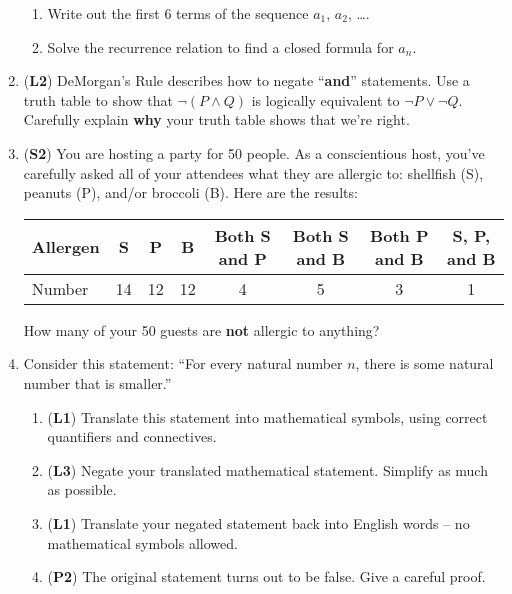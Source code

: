\documentclass[12pt]{article}
\begin{document}
\begin{enumerate}
\begin{enumerate}
    \item Write out the first 6 terms of the sequence $a_1$, $a_2$, \ldots.
    
    \item Solve the recurrence relation to find a closed formula for $a_n$.
    
\end{enumerate}


\item (\textbf{L2}) DeMorgan's Rule describes how to negate ``\textbf{and}'' statements. Use a truth table to show that  $\lnot(P \land Q)$ is logically equivalent to  $\lnot P \lor \lnot Q$.  Carefully explain \textbf{why} your truth table shows that we're right.


\item (\textbf{S2}) You are hosting a party for 50 people. As a conscientious host, you've carefully asked all of your attendees what they are allergic to: shellfish (S), peanuts (P), and/or broccoli (B). Here are the results:

\begin{tabular}{l|ccccccc}
Allergen & S  & P  & B  & Both S and P & Both S and B & Both P and B & S, P, and B \\\hline
Number   & 14 & 12 & 12 & 4            & 5            & 3            & 1
\end{tabular}

How many of your 50 guests are \textbf{not} allergic to anything?


\item Consider this statement: ``For every natural number $n$, there is some natural number that is smaller.''
\begin{enumerate}
    \item (\textbf{L1}) Translate this statement into mathematical symbols, using correct quantifiers and connectives. 
    
    \item (\textbf{L3}) Negate your translated mathematical statement. Simplify as much as possible.
    
    \item (\textbf{L1}) Translate your negated statement back into English words -- no mathematical symbols allowed.
    
    \item (\textbf{P2}) The original statement turns out to be false. Give a careful proof.
    
\end{enumerate}



\end{enumerate}
\end{document}
